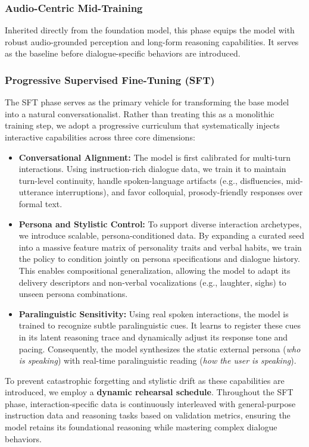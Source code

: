 \documentclass{llmxive}
\begin{document}
\subsubsection{Audio-Centric Mid-Training}
Inherited directly from the foundation model, this phase equips the model with robust audio-grounded perception and long-form reasoning capabilities. It serves as the baseline before dialogue-specific behaviors are introduced.

\subsubsection{Progressive Supervised Fine-Tuning (SFT)}
\label{sec:realtime_sft}
The SFT phase serves as the primary vehicle for transforming the base model into a natural conversationalist. Rather than treating this as a monolithic training step, we adopt a progressive curriculum that systematically injects interactive capabilities across three core dimensions:

\begin{itemize}
    \item \textbf{Conversational Alignment:} The model is first calibrated for multi-turn interactions. Using instruction-rich dialogue data, we train it to maintain turn-level continuity, handle spoken-language artifacts (e.g., disfluencies, mid-utterance interruptions), and favor colloquial, prosody-friendly responses over formal text.
    \item \textbf{Persona and Stylistic Control:} To support diverse interaction archetypes, we introduce scalable, persona-conditioned data. By expanding a curated seed into a massive feature matrix of personality traits and verbal habits, we train the policy to condition jointly on persona specifications and dialogue history. This enables compositional generalization, allowing the model to adapt its delivery descriptors and non-verbal vocalizations (e.g., laughter, sighs) to unseen persona combinations.
    \item \textbf{Paralinguistic Sensitivity:} Using real spoken interactions, the model is trained to recognize subtle paralinguistic cues. It learns to register these cues in its latent reasoning trace and dynamically adjust its response tone and pacing. Consequently, the model synthesizes the static external persona (\emph{who is speaking}) with real-time paralinguistic reading (\emph{how the user is speaking}).
\end{itemize}

To prevent catastrophic forgetting and stylistic drift as these capabilities are introduced, we employ a \textbf{dynamic rehearsal schedule}. Throughout the SFT phase, interaction-specific data is continuously interleaved with general-purpose instruction data and reasoning tasks based on validation metrics, ensuring the model retains its foundational reasoning while mastering complex dialogue behaviors.
\end{document}

